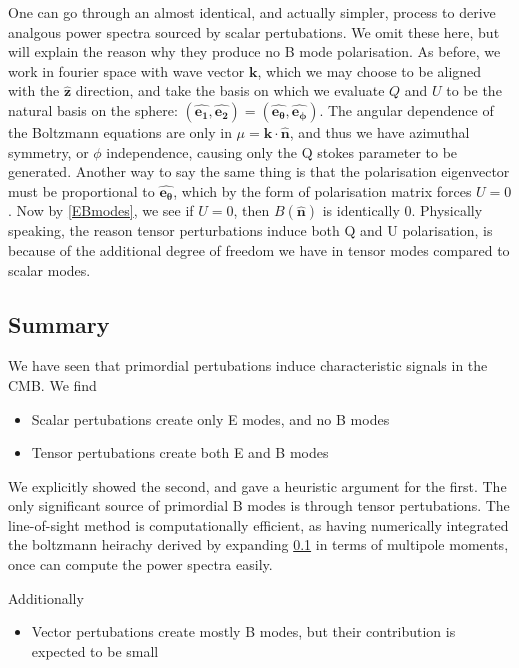 \documentclass[a4paper,10pt]{article}
\renewcommand{\v}[1]{\mathbf{#1}}
\newcommand{\unit}[1]{\hat{\v{#1}}}
\begin{document}
One can go through an almost identical, and actually simpler, process to derive analgous power spectra sourced by scalar pertubations. We omit these here, but will explain the reason why they produce no B mode polarisation. As before, we work in fourier space with wave vector $\v{k}$, which we may choose to be aligned with the $\unit{z}$ direction, and take the basis on which we evaluate $Q$ and $U$ to be the natural basis on the sphere: $(\unit{e_1}, \unit{e_2}) = (\unit{e_\theta}, \unit{e_\phi})$. The angular dependence of the Boltzmann equations are only in $\mu=\v{k}\cdot\unit{n}$, and thus we have azimuthal symmetry, or $\phi$ independence, causing only the Q stokes parameter to be generated. Another way to say the same thing is that the polarisation eigenvector must be proportional to $\unit{e_\theta}$, which by the form of polarisation matrix forces $U=0$. Now by \ref{EBmodes}, we see if $U=0$, then $B(\unit{n})$ is identically 0. Physically speaking, the reason tensor perturbations induce both Q and U polarisation, is because of the additional degree of freedom we have in tensor modes compared to scalar modes.


\subsection{Summary}

We have seen that primordial pertubations induce characteristic signals in the CMB. We find

\begin{itemize}
\item Scalar pertubations create only E modes, and no B modes
\item Tensor pertubations create both E and B modes
\end{itemize}


We explicitly showed the second, and gave a heuristic argument for the first. The only significant source of primordial B modes is through tensor pertubations. The line-of-sight method is computationally efficient, as having numerically integrated the boltzmann heirachy derived by expanding \ref{} in terms of multipole moments, once can compute the power spectra easily.


Additionally

\begin{itemize}
\item Vector pertubations create mostly B modes, but their contribution is expected to be small
\end{itemize}
\end{document}
